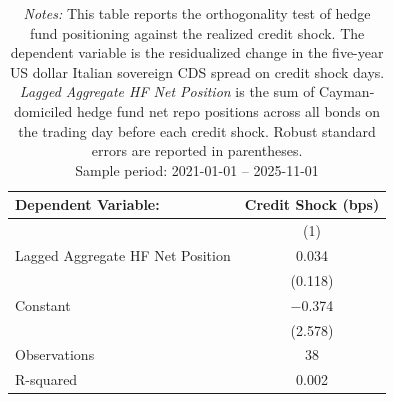 \documentclass[english, 11pt, oneside]{article}
\begin{document}
\begin{table}[h!]
\centering
\caption{\textbf{Pre-existing Positioning and the Credit Shock}}
\footnotesize
\setlength{\tabcolsep}{8pt}
\renewcommand{\arraystretch}{1.1}
\begin{tabular}{l c}
\toprule
\textbf{Dependent Variable:} & \textbf{Credit Shock (bps)} \\
\midrule
 & (1) \\
\midrule
Lagged Aggregate HF Net Position & 0.034 \\
 & (0.118) \\
\addlinespace
Constant & $-$0.374 \\
 & (2.578) \\
\midrule
Observations & 38 \\
R-squared & 0.002 \\
\bottomrule
\end{tabular}
\label{tab:orthogonality_cds}
\caption*{\textit{Notes:} This table reports the orthogonality test of hedge fund positioning against the realized credit shock. The dependent variable is the residualized change in the five-year US dollar Italian sovereign CDS spread on credit shock days. \textit{Lagged Aggregate HF Net Position} is the sum of Cayman-domiciled hedge fund net repo positions across all bonds on the trading day before each credit shock. Robust standard errors are reported in parentheses. \\ Sample period: 2021-01-01 -- 2025-11-01}
\end{table}
\end{document}
